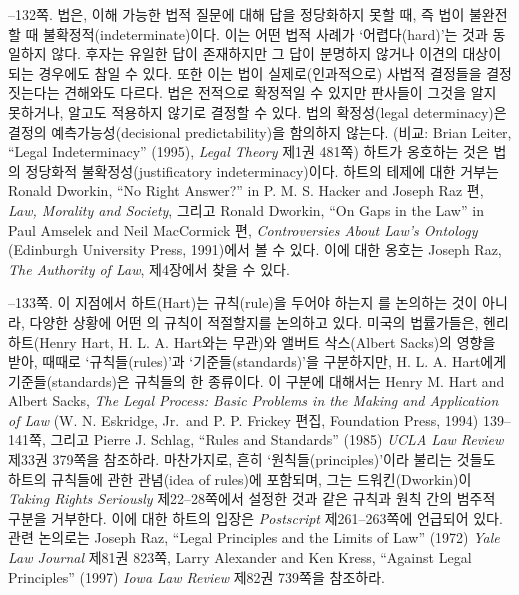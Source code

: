 {--132쪽.  법은,
이해 가능한 법적 질문에 대해  답을
정당화하지 못할 때, 즉 법이 불완전할 때 불확정적(indeterminate)이다.
이는 어떤 법적 사례가 ‘어렵다(hard)’는 것과 동일하지 않다. 후자는 유일한
답이 존재하지만 그 답이 분명하지 않거나 이견의 대상이 되는 경우에도 참일
수 있다. 또한 이는 법이 실제로(인과적으로) 사법적 결정들을 결정짓는다는
견해와도 다르다. 법은 전적으로 확정적일 수 있지만 판사들이 그것을 알지
못하거나, 알고도 적용하지 않기로 결정할 수 있다. 법의 확정성(legal
determinacy)은 결정의 예측가능성(decisional predictability)을 함의하지
않는다. (비교: Brian Leiter, “Legal Indeterminacy” (1995), \emph{Legal
Theory} 제1권 481쪽) 하트가 옹호하는 것은 법의 정당화적
불확정성(justificatory indeterminacy)이다. 하트의 테제에 대한 거부는
Ronald Dworkin, “No Right Answer?” in P. M. S. Hacker and Joseph Raz
편, \emph{Law, Morality and Society}, 그리고 Ronald Dworkin, “On Gaps
in the Law” in Paul Amselek and Neil MacCormick 편, \emph{Controversies
About Law's Ontology} (Edinburgh University Press, 1991)에서 볼 수 있다.
이에 대한 옹호는 Joseph Raz, \emph{The Authority of Law}, 제4장에서 찾을
수 있다.

--133쪽.  이 지점에서 하트(Hart)는 규칙(rule)을 두어야 하는지
를 논의하는 것이 아니라, 다양한 상황에 어떤
의 규칙이 적절할지를 논의하고 있다. 미국의 법률가들은,
헨리 하트(Henry Hart, H. L. A. Hart와는 무관)와 앨버트 삭스(Albert
Sacks)의 영향을 받아, 때때로 ‘규칙들(rules)’과 ‘기준들(standards)’을
구분하지만, H. L. A. Hart에게 기준들(standards)은 규칙들의 한 종류이다.
이 구분에 대해서는 Henry M. Hart and Albert Sacks, \emph{The Legal
Process: Basic Problems in the Making and Application of Law} (W. N.
Eskridge, Jr.~and P. P. Frickey 편집, Foundation Press, 1994)
139--141쪽, 그리고 Pierre J. Schlag, “Rules and Standards” (1985)
\emph{UCLA Law Review} 제33권 379쪽을 참조하라. 마찬가지로, 흔히
‘원칙들(principles)’이라 불리는 것들도 하트의 규칙들에 관한 관념(idea of
rules)에 포함되며, 그는 드워킨(Dworkin)이 \emph{Taking Rights Seriously}
제22--28쪽에서 설정한 것과 같은 규칙과 원칙 간의 범주적 구분을 거부한다.
이에 대한 하트의 입장은 \emph{Postscript} 제261--263쪽에 언급되어 있다.
관련 논의로는 Joseph Raz, “Legal Principles and the Limits of Law”
(1972) \emph{Yale Law Journal} 제81권 823쪽, Larry Alexander and Ken
Kress, “Against Legal Principles” (1997) \emph{Iowa Law Review} 제82권
739쪽을 참조하라.

}

